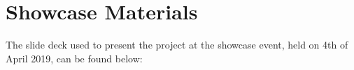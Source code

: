 \chapter{Showcase Materials}
The slide deck used to present the project at the showcase event, held on 4th of April 2019, can be found below:\\
